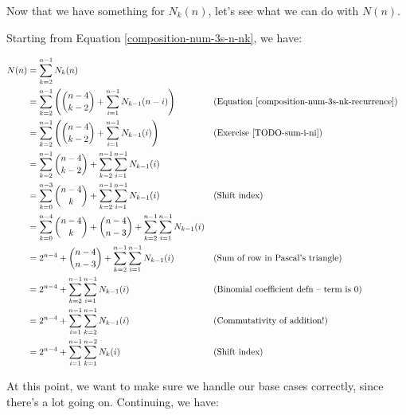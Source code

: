 Now that we have something for $N_k(n)$, let's see what we can do with $N(n)$. 

Starting from Equation \ref{composition-num-3s-n-nk}, we have:

\begin{align*}
N(n) &= \sum_{k=2}^{n-1} N_k(n) \\
&= \sum_{k=2}^{n-1} \left( \binom{n-4}{k-2} + \sum_{i=1}^{n-1} N_{k-1}(n-i) \right) && \text{(Equation \ref{composition-num-3s-nk-recurrence})} \\
&= \sum_{k=2}^{n-1} \left( \binom{n-4}{k-2} + \sum_{i=1}^{n-1} N_{k-1}(i) \right) && \text{(Exercise \ref{TODO-sum-i-ni})} \\
&= \sum_{k=2}^{n-1} \binom{n-4}{k-2} + \sum_{k=2}^{n-1} \sum_{i=1}^{n-1} N_{k-1}(i) \\
&= \sum_{k=0}^{n-3} \binom{n-4}{k} + \sum_{k=2}^{n-1} \sum_{i=1}^{n-1} N_{k-1}(i) && \text{(Shift index)} \\
&= \sum_{k=0}^{n-4} \binom{n-4}{k} + \binom{n-4}{n-3} + \sum_{k=2}^{n-1} \sum_{i=1}^{n-1} N_{k-1}(i) \\
&= 2^{n-4} + \binom{n-4}{n-3} + \sum_{k=2}^{n-1} \sum_{i=1}^{n-1} N_{k-1}(i) && \text{(Sum of row in Pascal's triangle)} \\
&= 2^{n-4} + \sum_{k=2}^{n-1} \sum_{i=1}^{n-1} N_{k-1}(i) && \text{(Binomial coefficient defn -- term is 0)} \\
&= 2^{n-4} + \sum_{i=1}^{n-1} \sum_{k=2}^{n-1} N_{k-1}(i) && \text{(Commutativity of addition!)} \\
&= 2^{n-4} + \sum_{i=1}^{n-1} \sum_{k=1}^{n-2} N_{k}(i) && \text{(Shift index)}
\end{align*}


At this point, we want to make sure we handle our base cases correctly, since there's a lot going on. Continuing, we have:

